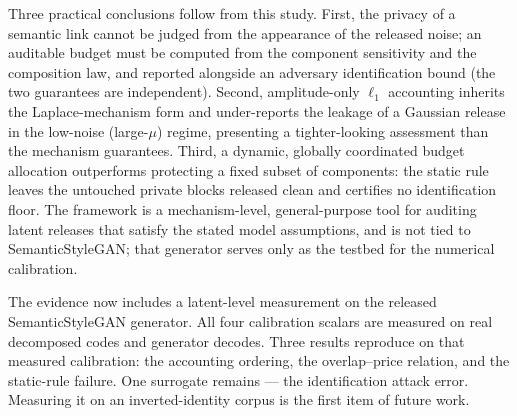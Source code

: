 \documentclass{ieeetj}
\theoremstyle{plain}
\theoremstyle{definition}
\begin{document}
Three practical conclusions follow from this study. First, the privacy of a
semantic link cannot be judged from the appearance of the released noise; an
auditable budget must be computed from the component sensitivity and the
composition law, and reported alongside an adversary identification bound
(the two guarantees are independent). Second, amplitude-only $\ell_1$
accounting inherits the Laplace-mechanism form and under-reports the leakage of
a Gaussian release in the low-noise (large-$\mu$) regime, presenting a
tighter-looking assessment than the mechanism guarantees. Third, a dynamic,
globally coordinated budget allocation outperforms protecting a fixed subset of
components: the static rule leaves the untouched private blocks released clean
and certifies no identification floor. The framework is a mechanism-level,
general-purpose tool for auditing latent releases that satisfy the stated
model assumptions, and is not tied to SemanticStyleGAN; that generator serves
only as the testbed for the numerical calibration.

The evidence now includes a latent-level measurement on the released SemanticStyleGAN
generator. All four calibration scalars are measured on real decomposed codes and
generator decodes. Three results reproduce on that measured calibration: the accounting
ordering, the overlap--price relation, and the static-rule failure. One surrogate
remains --- the identification attack error. Measuring it on an inverted-identity corpus
is the first item of future work.
\end{document}
